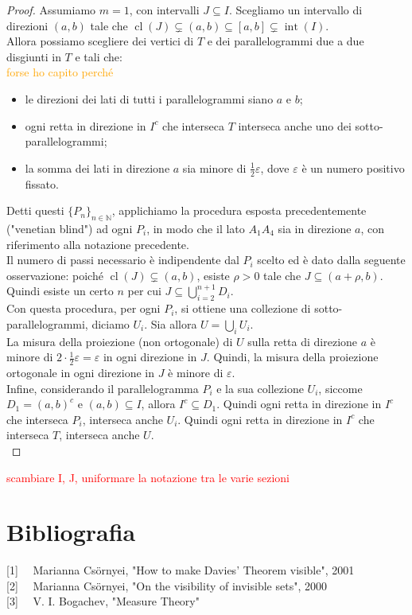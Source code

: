 \documentclass[a4paper, twoside,openright]{article}
\newcommand{\N}{\mathbb{N}}
\newcommand{\<}{\langle}
\renewcommand{\>}{\rangle}
\begin{document}
\begin{proof}
	Assumiamo $m=1$, con intervalli $J \subseteq I$. Scegliamo un intervallo di direzioni $(a, b)$ tale che $\operatorname{cl}(J) \subsetneq(a, b) \subseteq[a, b] \subsetneq \operatorname{int}(I)$.\\
	Allora possiamo scegliere dei vertici di $T$ e dei parallelogrammi due a due disgiunti in $T$ e tali che:\\
	\textcolor{orange}{forse ho capito perché}
		\begin{itemize}
		\item le direzioni dei lati di tutti i parallelogrammi siano $a$ e $b$;
		\item ogni retta in direzione in $I^c$ che interseca $T$ interseca anche uno dei sotto-parallelogrammi;
		\item la somma dei lati in direzione $a$ sia minore di $\frac{1}{2} \varepsilon$, dove $\varepsilon$ è un numero positivo fissato.
	\end{itemize}	
	Detti questi $\{P_n\}_{n \in \N}$, applichiamo la procedura esposta precedentemente ("venetian blind") ad ogni $P_i$, in modo che il lato $A_1A_4$ sia in direzione $a$, con riferimento alla notazione precedente.\\
	Il numero di passi necessario è indipendente dal $P_i$ scelto ed è dato dalla seguente osservazione: poiché $\operatorname{cl}(J) \subsetneq(a, b)$, esiste $\rho >0$ tale che $J \subseteq (a+\rho,b)$. Quindi esiste un certo $n$ per cui $J \subseteq \bigcup_{i=2}^{n+1}D_i$.\\
	Con questa procedura, per ogni $P_i$, si ottiene una collezione di sotto-parallelogrammi, diciamo $U_i$. Sia allora $U = \bigcup_i U_i$.\\
	La misura della proiezione (non ortogonale) di $U$ sulla retta di direzione $a$ è minore di $2 \cdot \frac{1}{2} \varepsilon=\varepsilon$ in ogni direzione in $J$. Quindi, la misura della proiezione ortogonale in ogni direzione in $J$ è minore di $\varepsilon$.\\
	Infine, considerando il parallelogramma $P_i$ e la sua collezione $U_i$, siccome $D_1 =(a,b)^c$ e $(a,b) \subseteq I$, allora $I^c \subseteq D_1$. Quindi ogni retta in direzione in $I^c$ che interseca $P_i$, interseca anche $U_i$. Quindi ogni retta in direzione in $I^c$ che interseca $T$, interseca anche $U$. \\
\end{proof}
 \textcolor{red}{scambiare I, J, uniformare la notazione tra le varie sezioni}

\newpage

\section{Bibliografia}

[1] \ \ Marianna Cs\"{o}rnyei, "How to make Davies' Theorem visible", 2001\\

[2] \ \ Marianna Cs\"{o}rnyei, "On the visibility of invisible sets", 2000\\

[3] \ \ V. I. Bogachev, "Measure Theory"
\end{document}
